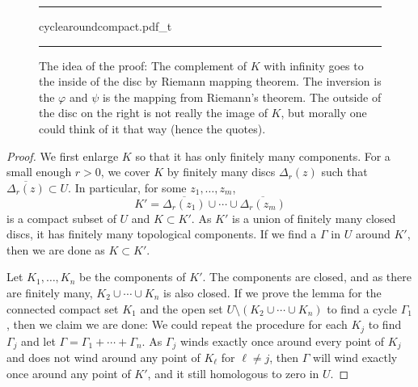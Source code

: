 \documentclass[12pt,openany]{book}
\theoremstyle{plain}
\theoremstyle{remark}
\theoremstyle{definition}
\newenvironment{myfig}{%
\begin{figure}[h!t]
\noindent\rule{\textwidth}{0.5pt}\vspace{12pt}\par\centering}%
{\par\noindent\rule{\textwidth}{0.5pt}
\end{figure}}
\theoremstyle{exercise}
\theoremstyle{example}
\begin{document}
\begin{myfig}
{cyclearoundcompact.pdf_t}
\caption{The idea of the proof: The complement of $K$ with infinity goes to
the inside of the disc by Riemann mapping theorem.  The inversion is the
$\varphi$ and $\psi$ is the mapping from Riemann's theorem.
The outside of the disc on the right is not really the image of $K$, but
morally one could think of it that way (hence the quotes).\label{fig:cyclearoundcompact}}
\end{myfig}

\begin{proof}
We first enlarge $K$ so that it
has only finitely many components.  For a small enough $r > 0$, we cover
$K$ by finitely many discs $\Delta_r(z)$ such that $\overline{\Delta_r(z)}
\subset U$.  In particular, for some $z_1,\ldots,z_m$,
\begin{equation*}
K' =
\overline{\Delta_r(z_1)}
\cup \cdots \cup
\overline{\Delta_r(z_m)}
\end{equation*}
is a compact subset of $U$ and $K \subset K'$.
As $K'$ is a union of finitely many closed discs, it has
finitely many topological components.
If we find a $\Gamma$ in $U$ around $K'$, then we are done as $K \subset K'$.

Let $K_1,\ldots,K_n$ be the components of $K'$.
The components are closed, and as there are finitely many,
$K_2 \cup \cdots \cup K_n$ is also closed.
If we prove the lemma for the connected compact set $K_1$ and
the open set $U \setminus ( K_2 \cup \cdots \cup K_n )$ to find a cycle
$\Gamma_1$, then we claim we are done: We could repeat the procedure
for each $K_j$ to find $\Gamma_j$ and let $\Gamma = \Gamma_1 + \cdots +
\Gamma_n$.  As $\Gamma_j$ winds exactly once around every point of $K_j$
and does not wind around any point of $K_\ell$ for $\ell \not= j$,
then $\Gamma$ will wind exactly once around any point of $K'$,
and it still homologous to zero in $U$.


\end{proof}
\end{document}
